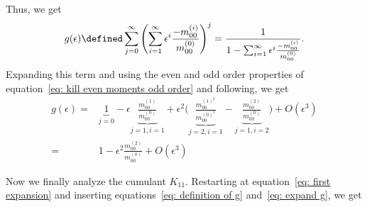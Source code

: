 Thus, we get
\begin{equation}
  \label{eq: definition of g}
  g(\epsilon) \defined \sum_{j=0}^\infty {\left(\sum_{i=1}^\infty \epsilon^i \frac{ - m_{00}^{(i)}}{ m_{00}^{(0)}}\right)}^j = \frac{1}{1 - \sum_{i=1}^\infty \epsilon^i \frac{ - m_{00}^{(i)}}{ m_{00}^{(0)}}}.
\end{equation}
Expanding this term and using the even and odd order properties of equation~\eqref{eq: kill even moments odd order} and following, we get
\begin{equation}
  \label{eq: expand g}
  \begin{aligned}
    g(\epsilon) = & \underbrace{1}_{j=0} - \epsilon \underbrace{ \frac{m_{00}^{(1)}}{m_{00}^{(0)}}}_{j=1,i=1}
    + \epsilon^2 \Bigg(
      \underbrace{\frac{m_{00}^{{(1)}^2}}{m_{00}^{{(0)}^2}}}_{j=2,i=1}
      - \underbrace{\frac{m_{00}^{(2)}}{m_{00}^{(0)}}}_{j=1,i=2} \Bigg) + O(\epsilon^3)
      \\=&
      1 - \epsilon^2 \frac{m_{00}^{(2)}}{m_{00}^{(0)}}  + O(\epsilon^3)
  \end{aligned}
\end{equation}

Now we finally analyze the cumulant $K_{11}$.
Restarting at equation~\eqref{eq: first expansion} and inserting equations~\eqref{eq: definition of g} and~\eqref{eq: expand g}, we get

